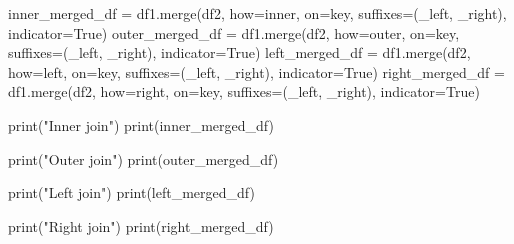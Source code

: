 \documentclass[
  polish,
  letterpaper,
  DIV=11,
  numbers=noendperiod]{scrreprt}
\newenvironment{Shaded}{\begin{snugshade}}{\end{snugshade}}
\newcommand{\BuiltInTok}[1]{\textcolor[rgb]{0.00,0.23,0.31}{#1}}
\newcommand{\NormalTok}[1]{\textcolor[rgb]{0.00,0.23,0.31}{#1}}
\newcommand{\OperatorTok}[1]{\textcolor[rgb]{0.37,0.37,0.37}{#1}}
\newcommand{\StringTok}[1]{\textcolor[rgb]{0.13,0.47,0.30}{#1}}
\newcommand{\VariableTok}[1]{\textcolor[rgb]{0.07,0.07,0.07}{#1}}
\begin{document}
\begin{Shaded}
\begin{Highlighting}[]
\NormalTok{inner\_merged\_df }\OperatorTok{=}\NormalTok{ df1.merge(df2, how}\OperatorTok{=}\StringTok{\textquotesingle{}inner\textquotesingle{}}\NormalTok{, on}\OperatorTok{=}\StringTok{\textquotesingle{}key\textquotesingle{}}\NormalTok{, suffixes}\OperatorTok{=}\NormalTok{(}\StringTok{\textquotesingle{}\_left\textquotesingle{}}\NormalTok{, }\StringTok{\textquotesingle{}\_right\textquotesingle{}}\NormalTok{),}
\NormalTok{                            indicator}\OperatorTok{=}\VariableTok{True}\NormalTok{)}
\NormalTok{outer\_merged\_df }\OperatorTok{=}\NormalTok{ df1.merge(df2, how}\OperatorTok{=}\StringTok{\textquotesingle{}outer\textquotesingle{}}\NormalTok{, on}\OperatorTok{=}\StringTok{\textquotesingle{}key\textquotesingle{}}\NormalTok{, suffixes}\OperatorTok{=}\NormalTok{(}\StringTok{\textquotesingle{}\_left\textquotesingle{}}\NormalTok{, }\StringTok{\textquotesingle{}\_right\textquotesingle{}}\NormalTok{),}
\NormalTok{                            indicator}\OperatorTok{=}\VariableTok{True}\NormalTok{)}
\NormalTok{left\_merged\_df }\OperatorTok{=}\NormalTok{ df1.merge(df2, how}\OperatorTok{=}\StringTok{\textquotesingle{}left\textquotesingle{}}\NormalTok{, on}\OperatorTok{=}\StringTok{\textquotesingle{}key\textquotesingle{}}\NormalTok{, suffixes}\OperatorTok{=}\NormalTok{(}\StringTok{\textquotesingle{}\_left\textquotesingle{}}\NormalTok{, }\StringTok{\textquotesingle{}\_right\textquotesingle{}}\NormalTok{),}
\NormalTok{                           indicator}\OperatorTok{=}\VariableTok{True}\NormalTok{)}
\NormalTok{right\_merged\_df }\OperatorTok{=}\NormalTok{ df1.merge(df2, how}\OperatorTok{=}\StringTok{\textquotesingle{}right\textquotesingle{}}\NormalTok{, on}\OperatorTok{=}\StringTok{\textquotesingle{}key\textquotesingle{}}\NormalTok{, suffixes}\OperatorTok{=}\NormalTok{(}\StringTok{\textquotesingle{}\_left\textquotesingle{}}\NormalTok{, }\StringTok{\textquotesingle{}\_right\textquotesingle{}}\NormalTok{),}
\NormalTok{                            indicator}\OperatorTok{=}\VariableTok{True}\NormalTok{)}

\BuiltInTok{print}\NormalTok{(}\StringTok{"Inner join"}\NormalTok{)}
\BuiltInTok{print}\NormalTok{(inner\_merged\_df)}

\BuiltInTok{print}\NormalTok{(}\StringTok{"Outer join"}\NormalTok{)}
\BuiltInTok{print}\NormalTok{(outer\_merged\_df)}

\BuiltInTok{print}\NormalTok{(}\StringTok{"Left join"}\NormalTok{)}
\BuiltInTok{print}\NormalTok{(left\_merged\_df)}

\BuiltInTok{print}\NormalTok{(}\StringTok{"Right join"}\NormalTok{)}
\BuiltInTok{print}\NormalTok{(right\_merged\_df)}
\end{Highlighting}
\end{Shaded}
\end{document}
